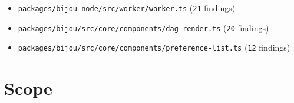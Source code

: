 \begin{itemize}
\tightlist
\item
  \texttt{p\allowbreak{}a\allowbreak{}c\allowbreak{}k\allowbreak{}a\allowbreak{}g\allowbreak{}e\allowbreak{}s\allowbreak{}/\allowbreak{}b\allowbreak{}i\allowbreak{}j\allowbreak{}o\allowbreak{}u\allowbreak{}-\allowbreak{}n\allowbreak{}o\allowbreak{}d\allowbreak{}e\allowbreak{}/\allowbreak{}s\allowbreak{}r\allowbreak{}c\allowbreak{}/\allowbreak{}w\allowbreak{}o\allowbreak{}r\allowbreak{}k\allowbreak{}e\allowbreak{}r\allowbreak{}/\allowbreak{}w\allowbreak{}o\allowbreak{}r\allowbreak{}k\allowbreak{}e\allowbreak{}r\allowbreak{}.\allowbreak{}t\allowbreak{}s} (\texttt{2\allowbreak{}1} findings)
\item
  \texttt{p\allowbreak{}a\allowbreak{}c\allowbreak{}k\allowbreak{}a\allowbreak{}g\allowbreak{}e\allowbreak{}s\allowbreak{}/\allowbreak{}b\allowbreak{}i\allowbreak{}j\allowbreak{}o\allowbreak{}u\allowbreak{}/\allowbreak{}s\allowbreak{}r\allowbreak{}c\allowbreak{}/\allowbreak{}c\allowbreak{}o\allowbreak{}r\allowbreak{}e\allowbreak{}/\allowbreak{}c\allowbreak{}o\allowbreak{}m\allowbreak{}p\allowbreak{}o\allowbreak{}n\allowbreak{}e\allowbreak{}n\allowbreak{}t\allowbreak{}s\allowbreak{}/\allowbreak{}d\allowbreak{}a\allowbreak{}g\allowbreak{}-\allowbreak{}r\allowbreak{}e\allowbreak{}n\allowbreak{}d\allowbreak{}e\allowbreak{}r\allowbreak{}.\allowbreak{}t\allowbreak{}s} (\texttt{2\allowbreak{}0} findings)
\item
  \texttt{p\allowbreak{}a\allowbreak{}c\allowbreak{}k\allowbreak{}a\allowbreak{}g\allowbreak{}e\allowbreak{}s\allowbreak{}/\allowbreak{}b\allowbreak{}i\allowbreak{}j\allowbreak{}o\allowbreak{}u\allowbreak{}/\allowbreak{}s\allowbreak{}r\allowbreak{}c\allowbreak{}/\allowbreak{}c\allowbreak{}o\allowbreak{}r\allowbreak{}e\allowbreak{}/\allowbreak{}c\allowbreak{}o\allowbreak{}m\allowbreak{}p\allowbreak{}o\allowbreak{}n\allowbreak{}e\allowbreak{}n\allowbreak{}t\allowbreak{}s\allowbreak{}/\allowbreak{}p\allowbreak{}r\allowbreak{}e\allowbreak{}f\allowbreak{}e\allowbreak{}r\allowbreak{}e\allowbreak{}n\allowbreak{}c\allowbreak{}e\allowbreak{}-\allowbreak{}l\allowbreak{}i\allowbreak{}s\allowbreak{}t\allowbreak{}.\allowbreak{}t\allowbreak{}s} (\texttt{1\allowbreak{}2} findings)
\end{itemize}

\section{Scope}\label{record-218-scope}


